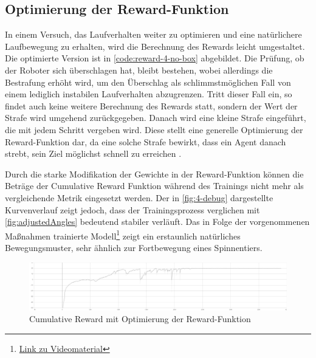 \subsection{Optimierung der Reward-Funktion}
In einem Versuch, das Laufverhalten weiter zu optimieren und eine natürlichere Laufbewegung zu erhalten, wird die Berechnung des Rewards leicht umgestaltet.
Die optimierte Version ist in \autoref{code:reward-4-no-box} abgebildet.
Die Prüfung, ob der Roboter sich überschlagen hat, bleibt bestehen, wobei allerdings die Bestrafung erhöht wird, um den Überschlag als schlimmstmöglichen Fall von einem lediglich instabilen Laufverhalten abzugrenzen.
Tritt dieser Fall ein, so findet auch keine weitere Berechnung des Rewards statt, sondern der Wert der Strafe wird umgehend zurückgegeben.
Danach wird eine kleine Strafe eingeführt, die mit jedem Schritt vergeben wird.
Diese stellt eine generelle Optimierung der Reward-Funktion dar, da eine solche Strafe bewirkt, dass ein Agent danach strebt, sein Ziel möglichst schnell zu erreichen \cite{mlagentsReward}.

Durch die starke Modifikation der Gewichte in der Reward-Funktion können die Beträge der Cumulative Reward Funktion während des Trainings nicht mehr als vergleichende Metrik eingesetzt werden.
Der in \autoref{fig:4-debug} dargestellte Kurvenverlauf zeigt jedoch, dass der Trainingsprozess verglichen mit \autoref{fig:adjustedAngles} bedeutend stabiler verläuft.
Das in Folge der vorgenommenen Maßnahmen trainierte Modell\footnote{\href{https://github.com/yschiebelhut/studienarbeit-doc/raw/master/Videos/SpiderBotDemos/4-debug-extended-vector-size.webm}{Link zu Videomaterial}} zeigt ein erstaunlich natürliches Bewegungsmuster, sehr ähnlich zur Fortbewegung eines Spinnentiers.

\begin{figure}
    
\end{figure}


\begin{figure}
    \centering
    \includegraphics[width=\textwidth]{Bilder/ml-agents/Environment_Cumulative Reward-4-debug-extended-vector-space.pdf}
    \caption{Cumulative Reward mit Optimierung der Reward-Funktion}
    \label{fig:4-debug}
\end{figure}


